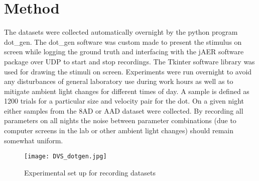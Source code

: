 \section{Method}
The datasets were collected automatically overnight by the python program dot\_gen. 
The dot\_gen software was custom made to present the stimulus on screen while logging the ground truth and interfacing with the jAER software package over UDP to start and stop recordings. 
The Tkinter software library was used for drawing the stimuli on screen. 
Experiments were run overnight to avoid any disturbances of general laboratory use during work hours as well as to mitigate ambient light changes for different times of day. 
A sample is defined as 1200 trials for a particular size and velocity pair for the dot.
On a given night either samples from the 8AD or AAD dataset were collected. 
By recording all parameters on all nights the noise between parameter combinations (due to computer screens in the lab or other ambient light changes) should remain somewhat uniform.

\begin{figure}
    \centering
    \texttt{[image: DVS\_dotgen.jpg]}
    \caption{Experimental set up for recording datasets}
    \label{fig:DVSdotgen}
\end{figure}






